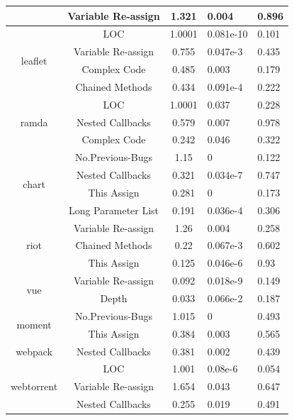 \begin{table}[t]
\begin{tabular}{c|c|c|p{2cm}|p{2cm}}
		& Variable Re-assign & 1.321 & 0.004 & 0.896 \\ \hline
		\multirow{4}{*}{leaflet}
		& LOC & 1.0001 & 0.081e-10 & 0.101 \\ \cline{2-5}
		& Variable Re-assign & 0.755 & 0.047e-3 & 0.435 \\ \cline{2-5}
		& Complex Code & 0.485 & 0.003 & 0.179 \\ \cline{2-5}
		& Chained Methods & 0.434 & 0.091e-4 & 0.222 \\ \hline
		\multirow{3}{*}{ramda}
		& LOC & 1.0001 & 0.037 & 0.228 \\ \cline{2-5}
		& Nested Callbacks & 0.579 & 0.007 & 0.978 \\ \cline{2-5}
		& Complex Code & 0.242 & 0.046 & 0.322 \\ \hline
		\multirow{4}{*}{chart}
		& No.Previous-Bugs & 1.15 & 0 & 0.122 \\ \cline{2-5}
		& Nested Callbacks & 0.321 & 0.034e-7 & 0.747 \\ \cline{2-5}
		& This Assign & 0.281 & 0 & 0.173 \\ \cline{2-5}
		& Long Parameter List & 0.191 & 0.036e-4 & 0.306 \\ \hline
		\multirow{3}{*}{riot}
		& Variable Re-assign & 1.26 & 0.004 & 0.258 \\ \cline{2-5}
		& Chained Methods & 0.22 & 0.067e-3 & 0.602 \\ \cline{2-5}
		& This Assign & 0.125 & 0.046e-6 & 0.93 \\ \hline
		\multirow{2}{*}{vue}
		& Variable Re-assign & 0.092 & 0.018e-9 & 0.149 \\ \cline{2-5}
		& Depth & 0.033 & 0.066e-2 & 0.187 \\ \hline
		\multirow{2}{*}{moment}
		& No.Previous-Bugs & 1.015 & 0 & 0.493 \\ \cline{2-5}
		& This Assign & 0.384 & 0.003 & 0.565 \\ \hline
		\multirow{1}{*}{webpack}
		& Nested Callbacks & 0.381 & 0.002 & 0.439 \\ \hline
		\multirow{3}{*}{webtorrent}
		& LOC & 1.001 & 0.08e-6 & 0.054 \\ \cline{2-5}
		& Variable Re-assign & 1.654 & 0.043 & 0.647 \\ \cline{2-5}
		& Nested Callbacks & 0.255 & 0.019 & 0.491 \\ \hline
	\end{tabular}
	\label{smelltypes3}
	\vspace{-15pt}
\end{table}

